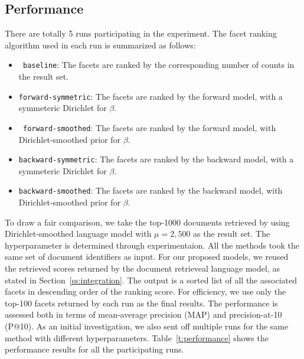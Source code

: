 \subsection{Performance}\label{ss:performance}

There are totally 5 runs participating in the experiment.  The facet ranking
algorithm used in each run is summarized as follows: \begin{itemize} \item {\tt
baseline}:  The facets are ranked by the corresponding number of counts in the
result set.  \item {\tt forward-symmetric}:  The facets are ranked by the
forward model, with a symmeteric Dirichlet for $\beta$.  \item {\tt
forward-smoothed}:  The facets are ranked by the forward model, with
Dirichlet-smoothed prior for $\beta$.  \item {\tt backward-symmetric}:  The
facets are ranked by the backward model, with a symmeteric Dirichlet for
$\beta$.  \item {\tt backward-smoothed}:  The facets are ranked by the backward
model, with Dirichlet-smoothed prior for $\beta$.  \end{itemize}

To draw a fair comparison, we take the top-1000 documents retrieved by using
Dirichlet-smoothed language model with $\mu = 2,500$ as the result set.  The
hyperparameter is determined through experimentaion.  All the methods took the
same set of document identifiers as input.  For our proposed models, we reused
the retrieved scores returned by the document retrieveal language model, as
stated in Section~\ref{ss:integration}.  The output is a sorted list of all the
associated facets in descending order of the ranking score.  For efficiency, we
use only the top-100 facets returned by each run as the final results.  The
performance is assessed both in terms of mean-average precision (MAP) and
precision-at-10 (P@10).  As an initial investigation, we also sent off multiple
runs for the same method with different hyperparameters.
Table~\ref{t:performance} shows the performance results for all the
participating runs.


